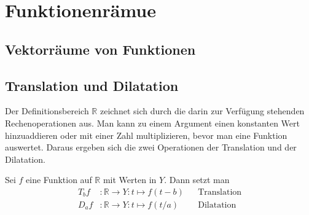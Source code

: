%
%
%
\section{Funktionenrämue
\label{section:funktionenraume}}

\subsection{Vektorräume von Funktionen}

\subsection{Translation und Dilatation}
Der Definitionsbereich $\mathbb R$ zeichnet sich durch die darin zur
Verfügung stehenden Rechenoperationen aus.
Man kann zu einem Argument einen konstanten Wert hinzuaddieren oder mit
einer Zahl multiplizieren, bevor man eine Funktion auswertet.
Daraus ergeben sich die zwei Operationen der Translation und der Dilatation.

\begin{definition}
Sei $f$ eine Funktion auf $\mathbb R$ mit Werten in $Y$.
Dann setzt man
\begin{align*}
T_bf&\colon \mathbb R \to Y: t\mapsto f(t-b)&&\text{Translation}
\\
D_af&\colon \mathbb R \to Y: t\mapsto f(t/a)&&\text{Dilatation}
\end{align*}
\end{definition}


